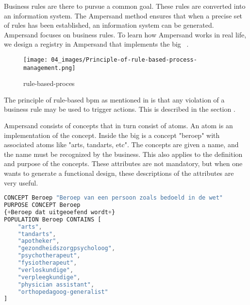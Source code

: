 Business rules are there to pursue a common goal.
These rules are converted into an information system. 
The Ampersand method ensures that when a precise set of rules has been established, an information system can be generated. 
Ampersand focuses on business rules.
To learn how Ampersand works in real life, we design a registry in Ampersand that implements the \acrshort{big}~ .

\begin{wrapfigure} {r}{0.52\textwidth} 
\texttt{[image: 04\_images/Principle-of-rule-based-process-management.png]}
\caption{rule-based-proces}
\label{fig:rule-based-proces}
\end{wrapfigure}


The principle of rule-based \acrfull{bpm} as mentioned in  is that any violation of a business rule may be used to trigger actions. 
This is described in the section .

Ampersand consists of concepts that in turn consist of atoms.
An atom is an implementation of the concept.
Inside the \acrshort{big} is a concept "beroep" with associated atoms like "arts, tandarts, etc".
The concepts are given a name, and the name must be recognized by the business.
This also applies to the definition and purpose of the concepts.
These attributes are not mandatory, but when one wants to generate a functional design, these descriptions of the attributes are very useful.
\begin{lstlisting}[language=Octave] 
CONCEPT Beroep "Beroep van een persoon zoals bedoeld in de wet" 
PURPOSE CONCEPT Beroep 
{+Beroep dat uitgeoefend wordt+}
POPULATION Beroep CONTAINS [
    "arts",
    "tandarts",
    "apotheker",
    "gezondheidszorgpsycholoog",
    "psychotherapeut",
    "fysiotherapeut",
    "verloskundige",
    "verpleegkundige",
    "physician assistant",
    "orthopedagoog-generalist"
]
\end{lstlisting}

